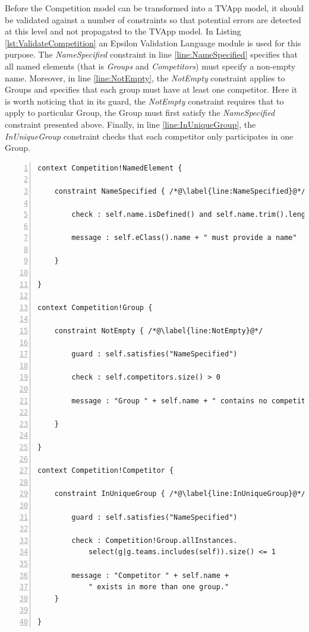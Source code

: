 Before the Competition model can be transformed into a TVApp model, it should be validated against a number of constraints so that potential errors are detected at this level and not propagated to the TVApp model. In Listing \ref{lst:ValidateCompetition} an Epsilon Validation Language module is used for this purpose. The \emph{NameSpecified} constraint in line \ref{line:NameSpecified} specifies that all named elements (that is \emph{Groups} and \emph{Competitors}) must specify a non-empty name. Moreover, in line \ref{line:NotEmpty}, the \emph{NotEmpty} constraint applies to Groups and specifies that each group must have at least one competitor. Here it is worth noticing that in its guard, the \emph{NotEmpty} constraint requires that to apply to particular Group, the Group must first satisfy the \emph{NameSpecified} constraint presented above. Finally, in line \ref{line:InUniqueGroup}, the \emph{InUniqueGroup} constraint checks that each competitor only participates in one Group.

\begin{lstlisting}[float=tbp, basicstyle=\ttfamily\footnotesize, flexiblecolumns=true, numbers=left, nolol=true, caption=EVL module that validates a Competition model, label=lst:ValidateCompetition, language=EVL, tabsize=2]
context Competition!NamedElement {
	
	constraint NameSpecified { /*@\label{line:NameSpecified}@*/
		
		check : self.name.isDefined() and self.name.trim().length > 0
		
		message : self.eClass().name + " must provide a name"
		
	}
	
}

context Competition!Group {
	
	constraint NotEmpty { /*@\label{line:NotEmpty}@*/
		
		guard : self.satisfies("NameSpecified")
		
		check : self.competitors.size() > 0
		
		message : "Group " + self.name + " contains no competitors"
		
	}
	
}

context Competition!Competitor {
	
	constraint InUniqueGroup { /*@\label{line:InUniqueGroup}@*/
		
		guard : self.satisfies("NameSpecified")
		
		check : Competition!Group.allInstances.
			select(g|g.teams.includes(self)).size() <= 1
		
		message : "Competitor " + self.name + 
			" exists in more than one group."
	}
	
}
\end{lstlisting}

